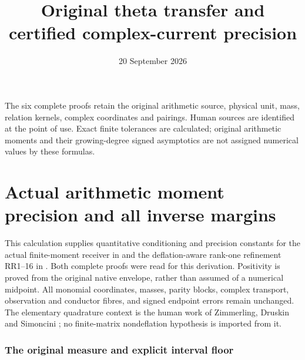 \documentclass[11pt]{article}
\title{Original theta transfer and certified complex-current precision}
\author{}\date{20 September 2026}
\begin{document}
\maketitle
The six complete proofs retain the original arithmetic source, physical
unit, mass, relation kernels, complex coordinates and pairings. Human
sources are identified at the point of use. Exact finite tolerances are
calculated; original arithmetic moments and their growing-degree signed
asymptotics are not assigned numerical values by these formulas.


\clearpage\begingroup
\part*{Actual arithmetic moment precision and all inverse margins}
\newtheorem{mprectheorem}{Theorem}
\newtheorem{mpreclemma}[mprectheorem]{Lemma}
\newtheorem{mprecproposition}[mprectheorem]{Proposition}
\newcommand{\mprecC}{\mathbb C}
\newcommand{\mprecR}{\mathbb R}
\newcommand{\mprectr}{\operatorname{tr}}
\newcommand{\mprecdiag}{\operatorname{diag}}
\newcommand{\mprecnorm}[1]{\left\lVert#1\right\rVert}


This calculation supplies quantitative conditioning and precision
constants for the actual finite-moment receiver in \cite{mprec:FM} and the
deflation-aware rank-one refinement RR1--16 in \cite{mprec:RR}. Both complete
proofs were read for this derivation. Positivity is proved from the
original native envelope, rather than assumed of a numerical midpoint.
All monomial coordinates, masses, parity blocks, complex transport,
observation and conductor fibres, and signed endpoint errors remain
unchanged. The elementary quadrature context is the human work of
Zimmerling, Druskin and Simoncini \cite{mprec:ZDS}; no finite-matrix
nondeflation hypothesis is imported from it.

\section{The original measure and explicit interval floor}
\end{document}

